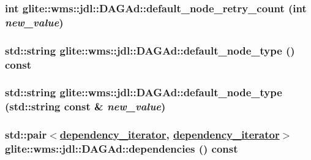 \hypertarget{classglite_1_1wms_1_1jdl_1_1DAGAd_a7}{
\subsubsection[default\_\-node\_\-retry\_\-count]{\setlength{\rightskip}{0pt plus 5cm}int glite::wms::jdl::DAGAd::default\_\-node\_\-retry\_\-count (int {\em new\_\-value})}}
\label{classglite_1_1wms_1_1jdl_1_1DAGAd_a7}


\hypertarget{classglite_1_1wms_1_1jdl_1_1DAGAd_a6}{
\subsubsection[default\_\-node\_\-type]{\setlength{\rightskip}{0pt plus 5cm}std::string glite::wms::jdl::DAGAd::default\_\-node\_\-type () const}}
\label{classglite_1_1wms_1_1jdl_1_1DAGAd_a6}


\hypertarget{classglite_1_1wms_1_1jdl_1_1DAGAd_a5}{
\subsubsection[default\_\-node\_\-type]{\setlength{\rightskip}{0pt plus 5cm}std::string glite::wms::jdl::DAGAd::default\_\-node\_\-type (std::string const \& {\em new\_\-value})}}
\label{classglite_1_1wms_1_1jdl_1_1DAGAd_a5}


\hypertarget{classglite_1_1wms_1_1jdl_1_1DAGAd_a20}{
\subsubsection[dependencies]{\setlength{\rightskip}{0pt plus 5cm}std::pair$<$\hyperlink{structglite_1_1wms_1_1jdl_1_1DAGAdDependencyIterator}{dependency\_\-iterator}, \hyperlink{structglite_1_1wms_1_1jdl_1_1DAGAdDependencyIterator}{dependency\_\-iterator}$>$ glite::wms::jdl::DAGAd::dependencies () const}}
\label{classglite_1_1wms_1_1jdl_1_1DAGAd_a20}



